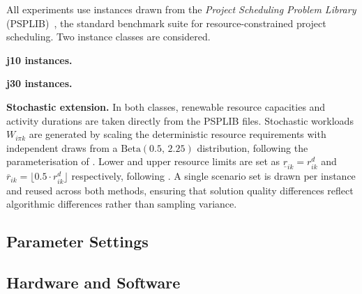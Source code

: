 
All experiments use instances drawn from the
\emph{Project Scheduling Problem Library}
(PSPLIB)~\parencite{KolischHartmann1999}, the standard benchmark
suite for resource-constrained project scheduling. Two instance
classes are considered.

\textbf{j10 instances.}

\textbf{j30 instances.}

\textbf{Stochastic extension.}
In both classes, renewable resource capacities and activity
durations are taken directly from the PSPLIB files. Stochastic
workloads $W_{i\pi k}$ are generated by scaling the deterministic
resource requirements with independent draws from a
$\mathrm{Beta}(0.5,\,2.25)$ distribution, following the
parameterisation of \cite{Lamas2016}. Lower and upper resource
limits are set as $\underline{r}_{ik} = r^d_{ik}$ and
$\overline{r}_{ik} = \lfloor 0.5 \cdot r^d_{ik} \rfloor$
respectively, following \cite{Mendl2024}. A single scenario set
is drawn per instance and reused across both methods, ensuring
that solution quality differences reflect algorithmic
differences rather than sampling variance.

\subsection{Parameter Settings}
\label{subsec:params}


\subsection{Hardware and Software}
\label{subsec:hardware}


